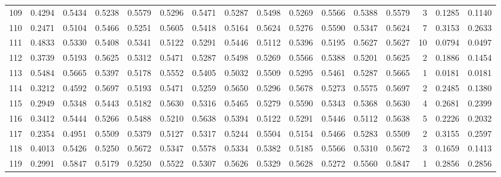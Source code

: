 \begin{tabular}{lrrrrrrrrrrrrrrr}
109 &      0.4294 &  0.5434 &  0.5238 &  0.5579 &  0.5296 &  0.5471 &  0.5287 &  0.5498 &  0.5269 &  0.5566 &   0.5388 &     0.5579 &      3 &                    0.1285 &                     0.1140 \\
110 &      0.2471 &  0.5104 &  0.5466 &  0.5251 &  0.5605 &  0.5418 &  0.5164 &  0.5624 &  0.5276 &  0.5590 &   0.5347 &     0.5624 &      7 &                    0.3153 &                     0.2633 \\
111 &      0.4833 &  0.5330 &  0.5408 &  0.5341 &  0.5122 &  0.5291 &  0.5446 &  0.5112 &  0.5396 &  0.5195 &   0.5627 &     0.5627 &     10 &                    0.0794 &                     0.0497 \\
112 &      0.3739 &  0.5193 &  0.5625 &  0.5312 &  0.5471 &  0.5287 &  0.5498 &  0.5269 &  0.5566 &  0.5388 &   0.5201 &     0.5625 &      2 &                    0.1886 &                     0.1454 \\
113 &      0.5484 &  0.5665 &  0.5397 &  0.5178 &  0.5552 &  0.5405 &  0.5032 &  0.5509 &  0.5295 &  0.5461 &   0.5287 &     0.5665 &      1 &                    0.0181 &                     0.0181 \\
114 &      0.3212 &  0.4592 &  0.5697 &  0.5193 &  0.5471 &  0.5259 &  0.5650 &  0.5296 &  0.5678 &  0.5273 &   0.5575 &     0.5697 &      2 &                    0.2485 &                     0.1380 \\
115 &      0.2949 &  0.5348 &  0.5443 &  0.5182 &  0.5630 &  0.5316 &  0.5465 &  0.5279 &  0.5590 &  0.5343 &   0.5368 &     0.5630 &      4 &                    0.2681 &                     0.2399 \\
116 &      0.3412 &  0.5444 &  0.5266 &  0.5488 &  0.5210 &  0.5638 &  0.5394 &  0.5122 &  0.5291 &  0.5446 &   0.5112 &     0.5638 &      5 &                    0.2226 &                     0.2032 \\
117 &      0.2354 &  0.4951 &  0.5509 &  0.5379 &  0.5127 &  0.5317 &  0.5244 &  0.5504 &  0.5154 &  0.5466 &   0.5283 &     0.5509 &      2 &                    0.3155 &                     0.2597 \\
118 &      0.4013 &  0.5426 &  0.5250 &  0.5672 &  0.5347 &  0.5578 &  0.5334 &  0.5382 &  0.5185 &  0.5566 &   0.5310 &     0.5672 &      3 &                    0.1659 &                     0.1413 \\
119 &      0.2991 &  0.5847 &  0.5179 &  0.5250 &  0.5522 &  0.5307 &  0.5626 &  0.5329 &  0.5628 &  0.5272 &   0.5560 &     0.5847 &      1 &                    0.2856 &                     0.2856 \\

\end{tabular}
